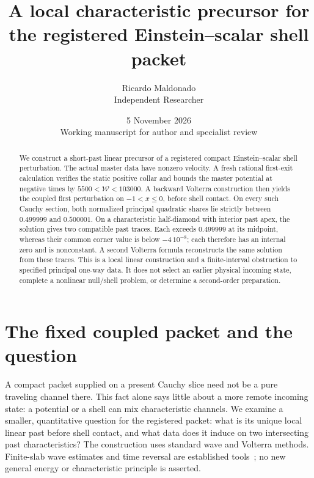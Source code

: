 \documentclass[11pt]{article}
\title{A local characteristic precursor for the registered Einstein--scalar shell packet}
\author{Ricardo Maldonado\\Independent Researcher}
\date{5 November 2026\\[3pt]\small Working manuscript for author and specialist review}
\begin{document}
\maketitle
\begin{abstract}
We construct a short-past linear precursor of a registered compact
Einstein--scalar shell perturbation. The actual master data have nonzero
velocity. A fresh rational first-exit calculation verifies the static positive
collar and bounds the master potential at negative times by
$5500<\mathcal W<103000$. A backward Volterra construction then yields the
coupled first perturbation on $-1<x\le0$, before shell contact.
On every such Cauchy section, both normalized principal quadratic shares lie
strictly between $0.499999$ and $0.500001$.
On a characteristic half-diamond with interior past apex, the solution gives
two compatible past traces. Each exceeds $0.499999$ at its midpoint, whereas
their common corner value is below $-4\,10^{-8}$; each therefore has an
internal zero and is nonconstant. A second Volterra formula reconstructs the
same solution from these traces. This is a local linear construction and a
finite-interval obstruction to specified principal one-way data. It does not
select an earlier physical incoming state, complete a nonlinear null/shell
problem, or determine a second-order preparation.
\end{abstract}

\section{The fixed coupled packet and the question}
A compact packet supplied on a present Cauchy slice need not be a pure
traveling channel there. This fact alone says little about a more remote
incoming state: a potential or a shell can mix characteristic channels.
We examine a smaller, quantitative question for the registered packet:
what is its unique local linear past before shell contact, and what data
does it induce on two intersecting past characteristics?
The construction uses standard wave and Volterra methods. Finite-slab wave
estimates and time reversal are established tools~\cite{btw}; no new general
energy or characteristic principle is asserted.
\end{document}
